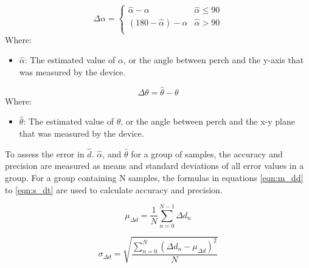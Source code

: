 \begin{minipage}{\linewidth}
    \begin{equation}
        \Delta \alpha = \begin{cases}
            \hat{\alpha} - \alpha & \hat{\alpha} \leq 90 \\
            (180 - \hat{\alpha}) - \alpha & \hat{\alpha} > 90 \\
        \end{cases}
        \label{eqn:da}
    \end{equation}
    Where:
    \begin{itemize}
        \item $\hat{\alpha}$: The estimated value of $\alpha$, or the angle between perch and the y-axis that was measured by the device.
    \end{itemize}
\end{minipage}

\begin{minipage}{\linewidth}
    \begin{equation}
        \Delta \theta = \hat{\theta} - \theta
        \label{eqn:dt}
    \end{equation}
    Where:
    \begin{itemize}
        \item $\hat{\theta}$: The estimated value of $\theta$, or the angle between perch and the x-y plane that was measured by the device.
    \end{itemize}
\end{minipage}


To assess the error in $\hat{d}$. $\hat{\alpha}$, and $\hat{\theta}$ for a group of samples,
the accuracy and precision are measured as means and standard deviations of all error 
values in a group. For a group containing N samples, the formulas in equations 
\ref{eqn:m_dd} to \ref{eqn:s_dt} are used to calculate accuracy and precision.

\begin{minipage}{\linewidth}
    \begin{equation}
        \mu_{\Delta d} = \frac{1}{N} \sum_{n=0}^{N-1} \Delta d_n
        \label{eqn:m_dd}
    \end{equation}
\end{minipage}

\begin{minipage}{\linewidth}
    \begin{equation}
        \sigma_{\Delta d} = \sqrt{\frac{\sum_{n=0}^{N} (\Delta d_n - \mu_{\Delta d})^2 }{N}}
        \label{eqn:s_dd}
    \end{equation}
\end{minipage}

